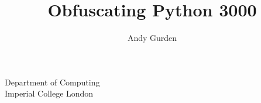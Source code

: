 \usepackage{listings}
\lstset{language=Python, showstringspaces=false}
\usepackage{graphicx}
\usepackage{tikz}
\usetikzlibrary{positioning,shadows,arrows}






%
%


{

}


\usepackage[english]{babel}

\usepackage[latin1]{inputenc}

\usepackage{times}
\usepackage[T1]{fontenc}


\title %
{Obfuscating Python 3000}


\author %
{Andy Gurden} %

\institute %
{
  Department of Computing\\
  Imperial College London
}

